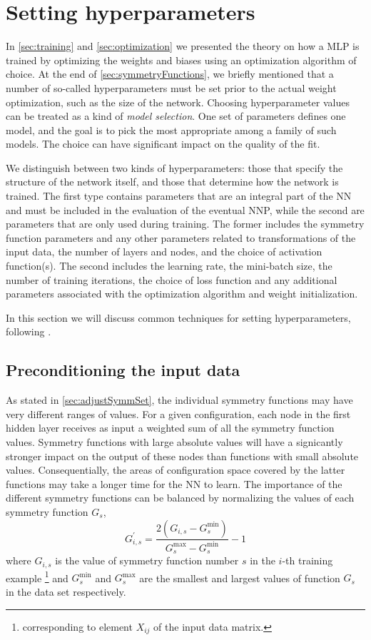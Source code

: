 \documentclass[twoside,english]{uiofysmaster}
\begin{document}
\section{Setting hyperparameters} \label{sec:settingHyperParams}
In \autoref{sec:training} and \autoref{sec:optimization} we presented the theory on how a MLP is trained 
by optimizing the weights and biases using an optimization algorithm of choice. 
At the end of \autoref{sec:symmetryFunctions}, we briefly mentioned that a number of so-called hyperparameters must be set
prior to the actual weight optimization, such as the size of the network. 
Choosing hyperparameter values can be treated as a
kind of \textit{model selection}. One set of parameters defines one model, and the goal is to pick the most appropriate 
among a family of such models. The choice can have significant impact on the quality of the fit. 

We distinguish between two kinds of hyperparameters: those that specify the structure of the 
network itself, and those that determine how the network is trained. 
The first type contains parameters that are an integral part of the NN and must be included in the evaluation of the eventual NNP, 
while the second are parameters that are only used during training. The former includes the symmetry function parameters
and any other parameters related to transformations of the input data, the number of layers and nodes, and the choice of 
activation function(s). The second includes 
the learning rate, the mini-batch size, the number of training iterations, the choice of loss function and any additional 
parameters associated with the optimization algorithm and weight initialization.

In this section we will discuss common techniques for setting hyperparameters, following \cite{Bengio12}. 

\subsection{Preconditioning the input data} \label{sec:transformInputData}
As stated in \autoref{sec:adjustSymmSet}, the individual symmetry functions may have very different ranges of values. 
For a given configuration, each node in the first hidden layer receives as input a weighted sum of all the symmetry function values.
Symmetry functions with large absolute values will have a signicantly stronger impact on the output of these nodes than 
functions with small absolute values. Consequentially, the areas of configuration space covered by the latter functions
may take a longer time for the NN to learn. The importance of the different symmetry functions can be balanced
by normalizing the values \cite{Behler15} of each symmetry function $G_s$, 
\begin{equation}
 G_{i,s}^\prime = \frac{2(G_{i,s} - G^{\min}_s)} {G^{\max}_s - G^{\min}_s} - 1
 \label{scalingInputData}
\end{equation}
where $G_{i,s}$ is the value of symmetry function number $s$ in the $i$-th training example 
\footnote{corresponding to element $X_{ij}$ of the input data matrix.} and
$G_s^{\min}$ and $G_s^{\max}$ are the smallest and largest values of function $G_s$ in the data set respectively.
\end{document}
